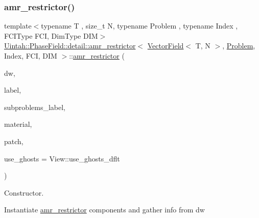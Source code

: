 \subsubsection{\texorpdfstring{amr\+\_\+restrictor()}{amr\_restrictor()}\hspace{0.1cm}{\footnotesize\ttfamily [2/3]}}
{\footnotesize\ttfamily template$<$typename T , size\+\_\+t N, typename Problem , typename Index , F\+C\+I\+Type F\+CI, Dim\+Type D\+IM$>$ \\
\hyperlink{classUintah_1_1PhaseField_1_1detail_1_1amr__restrictor}{Uintah\+::\+Phase\+Field\+::detail\+::amr\+\_\+restrictor}$<$ \hyperlink{structUintah_1_1PhaseField_1_1VectorField}{Vector\+Field}$<$ T, N $>$, \hyperlink{classUintah_1_1PhaseField_1_1Problem}{Problem}, Index, F\+CI, D\+IM $>$\+::\hyperlink{classUintah_1_1PhaseField_1_1detail_1_1amr__restrictor}{amr\+\_\+restrictor} (\begin{DoxyParamCaption}\item[{Data\+Warehouse $\ast$}]{dw,  }\item[{const typename \hyperlink{structUintah_1_1PhaseField_1_1VectorField_a59698346336d8cdfdf767367839f2be9}{Field\+::label\+\_\+type} \&}]{label,  }\item[{const Var\+Label $\ast$}]{subproblems\+\_\+label,  }\item[{int}]{material,  }\item[{const Patch $\ast$}]{patch,  }\item[{bool}]{use\+\_\+ghosts = {\ttfamily View\+:\+:use\+\_\+ghosts\+\_\+dflt} }\end{DoxyParamCaption})\hspace{0.3cm}{\ttfamily [inline]}}



Constructor. 

Instantiate \hyperlink{classUintah_1_1PhaseField_1_1detail_1_1amr__restrictor}{amr\+\_\+restrictor} components and gather info from dw



